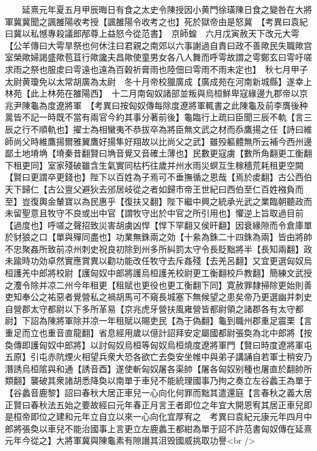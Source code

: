 　　延熹元年夏五月甲辰晦日有食之太史令陳授因小黄門徐璜陳日食之變咎在大將軍冀冀聞之諷雒陽收考授【諷雒陽令收考之也】死於獄帝由是怒冀　【考異曰袁紀曰冀以私憾專殺議郎邴尊上益怒今從范書】　京師蝗　六月戊寅赦天下改元大雩【公羊傳曰大雩旱祭也何休注曰君親之南郊以六事謝過自責曰政不善歟民失職歟宫室榮歟婦謁盛歟苞苴行歟讒夫昌歟使童男女各八人舞而呼雩故謂之雩鄭玄曰雩吁嗟求雨之祭也服䖍曰雩遠也遠為百穀祈膏雨也陸佃曰雩雨不雨未定也】　秋七月甲子太尉黄瓊免以太常胡廣為太尉　冬十月帝校獵廣成【廣成苑在河南新城縣】遂幸上林苑【此上林苑在雒陽西】　十二月南匈奴諸部並叛與烏桓鮮卑寇緣邊九郡帝以京兆尹陳龜為度遼將軍　【考異曰按匈奴傳每除度遼將軍輒書之此陳龜及前李膺後种暠皆不記一時既不當有兩官今約其事分著前後】龜臨行上疏曰臣聞三辰不軌【言三辰之行不順軌也】擢士為相蠻夷不恭拔卒為將臣無文武之材而忝鷹揚之任【詩曰維師尚父時維鷹揚爾雅翼鷹好揚隼好翔故以比尚父之武】雖殁軀體無所云補今西州邊鄙土地塉埆【塉秦昔翻賢曰埆音覺又音確土薄也】民數更寇虜【數所角翻更工衡翻下租更同】室家殘破雖含生氣實同枯朽往歲并州水雨災螟互生稼穡荒耗租更空闕【賢曰更謂卒更錢也】陛下以百姓為子焉可不垂撫循之恩哉【焉於䖍翻】古公西伯天下歸仁【古公亶父避狄去邠居岐從之者如歸市帝王世紀曰西伯至仁百姓襁負而至】豈復輿金輦寶以為民惠乎【復扶又翻】陛下繼中興之統承光武之業臨朝聽政而未留聖意且牧守不良或出中官【謂牧守出於中官之所引用也】懼逆上旨取過目前【過度也】呼嗟之聲招致災害胡虜凶悍【悍下罕翻又侯旰翻】因衰緣隙而令倉庫單於豺狼之口【單與殫同盡也】功業無銖兩之効【十絫為銖二十四銖為兩】皆由將帥不忠聚姦所致前凉州刺史祝良初除到州多所糾罰太守令長貶黜將半【長知兩翻】政未踰時功効卓然實應賞異以勸功能改任牧守去斥姦殘【去羌呂翻】又宜更選匈奴烏桓護羌中郎將校尉【護匈奴中郎將護烏桓護羌校尉更工衡翻校戶教翻】簡練文武授之灋令除并凉二州今年租更【租賦也更役也更工衡翻下同】寛赦罪隸掃除更始則善吏知奉公之祐惡者覺營私之禍胡馬可不窺長城塞下無候望之患矣帝乃更選幽并刺史自營郡太守都尉以下多所革易【京兆虎牙營扶風雍營皆都尉領之諸郡各有太守都尉】下詔為陳將軍除并凉一年租賦以賜吏民【為于偽翻】龜到職州郡重足震栗【言重足而立也重音直龍翻】省息經用歲以億計詔拜安定屬國都尉張奐為北中郎將【按奐傳即護匈奴中郎將】以討匈奴烏桓等匈奴烏桓燒度遼將軍門【賢曰時度遼將軍屯五原】引屯赤阬煙火相望兵衆大恐各欲亡去奐安坐帷中與弟子講誦自若軍士稍安乃潛誘烏桓隂與和通【誘音酉】遂使斬匈奴屠各渠帥【屠各匈奴别種也屠直於翻帥所類翻】襲破其衆諸胡悉降奐以南單于車兒不能統理國事乃拘之奏立左谷蠡王為單于【谷蠡音鹿黎】詔曰春秋大居正車兒一心向化何罪而黜其遣還庭【言春秋之義大居正賢曰春秋法五始之要故經曰元年春正月言王者即位之年宜大開恩宥其居正車兒即是桓帝即位之建和元年立自立以來一心向化宜厚宥之　考異曰袁紀元康元年四月中郎將張奐以車兒不能治國事上言更立左鹿蠡王都紺為單于詔不許范書匈奴傳在延熹元年今從之】大將軍冀與陳龜素有隙譖其沮毁國威挑取功譽<br />
